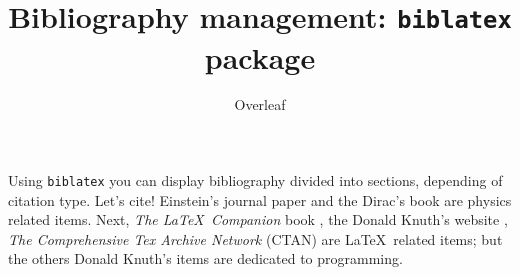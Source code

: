\documentclass{article}
\title{Bibliography management: \texttt{biblatex} package}
\author{Overleaf}
\date{ }
\begin{document}
	
	\maketitle
	
	Using \texttt{biblatex} you can display bibliography divided into sections, 
	depending of citation type. 
	Let's cite! Einstein's journal paper \cite{einstein} and the Dirac's 
	book \cite{dirac} are physics related items. 
	Next, \textit{The \LaTeX\ Companion} book \cite{latexcompanion}, the Donald 
	Knuth's website \cite{knuthwebsite}, \textit{The Comprehensive Tex Archive 
		Network} (CTAN) \cite{ctan} are \LaTeX\ related items; but the others Donald 
	Knuth's items \cite{knuth-fa,knuth-acp} are dedicated to programming. 
	
	\medskip
	
	\printbibliography
	
\end{document}

